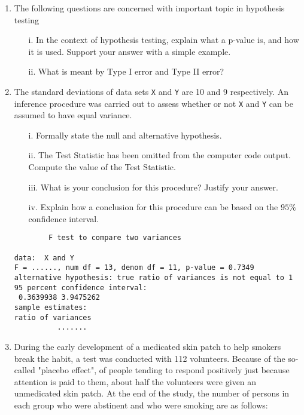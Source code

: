\documentclass[a4paper,12pt]{article}
\begin{document}
\begin{enumerate}
\item The following questions are concerned with important topic in hypothesis testing
\begin{itemize}
\item[i.] In the context of hypothesis testing, explain what a p-value is, and how it is used. Support your answer with a simple example.
\item[ii.]What is meant by Type I error and Type II error?
\end{itemize}

\item 
The standard deviations of data sets \texttt{X} and \texttt{Y} are 10 and 9 respectively. An inference procedure was carried out to assess whether or not \texttt{X} and \texttt{Y} can be assumed to have equal variance.
\begin{itemize}
\item[i.] Formally state the null and alternative hypothesis.
\item[ii.] The Test Statistic has been omitted from the computer code output. Compute the value of the Test Statistic.
\item[iii.] What is your conclusion for this procedure? Justify your answer.
\item[iv.] Explain how a conclusion for this procedure can be based on the $95\%$ confidence interval.
\end{itemize}

\begin{framed}
\begin{verbatim}
        F test to compare two variances

data:  X and Y
F = ......, num df = 13, denom df = 11, p-value = 0.7349
alternative hypothesis: true ratio of variances is not equal to 1
95 percent confidence interval:
 0.3639938 3.9475262
sample estimates:
ratio of variances
          .......
\end{verbatim}
\end{framed}

\item 
 During the early development of a medicated skin patch to help smokers break the habit, a test was conducted with 112 volunteers.  Because of the so-called
 "placebo effect", of people tending to respond positively just because attention is paid to them, about half the volunteers were given an unmedicated skin patch.  At the end of the study, the number of persons in each group who were abstinent and who were smoking are as follows:
 

\end{enumerate}
\end{document}
